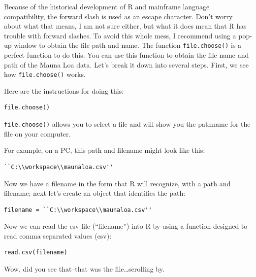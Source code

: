 \documentclass{tufte-handout}\usepackage[]{graphicx}\usepackage[]{color}
\begin{document}
Because of the historical development of R and mainframe language compatibility, the forward slash is used as an escape character. Don't worry about what that means, I am not sure either, but what it does mean that R has trouble with forward slashes. To avoid this whole mess, I recommend using a pop-up window to obtain the file path and name.  The function \texttt{file.choose()} is a perfect function to do this. You can use this function to obtain the file name and path of the Mauna Loa data.  Let's break it down into several steps. First, we see how \texttt{file.choose()} works.  

Here are the instructions for doing this:

\begin{verbatim}
file.choose()
\end{verbatim}

\texttt{file.choose()} allows you to select a file and will show you the pathname for the file on your computer. 


For example, on a PC, this path and filename might look like this: 
\begin{verbatim}
``C:\\workspace\\maunaloa.csv''
\end{verbatim}

Now we have a filename in the form that R will recognize, with a path and filename; next let's create an object that identifies the path:

\begin{verbatim}
filename = ``C:\\workspace\\maunaloa.csv''
\end{verbatim}
Now we can read the csv file (``filename'') into R by using a function designed to read comma separated values (csv):

\begin{verbatim}
read.csv(filename) 
\end{verbatim}

Wow, did you see that--that was the file\ldots scrolling by. 
\end{document}
